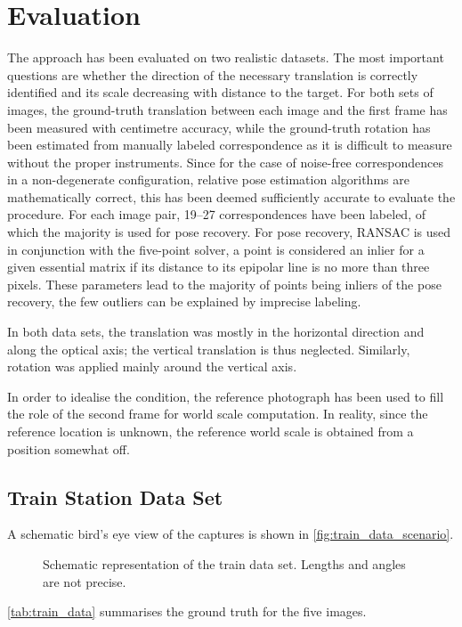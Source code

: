 \chapter{Evaluation}

The approach has been evaluated on two realistic datasets. The most important
questions are whether the direction of the necessary translation is correctly
identified and its scale decreasing with distance to the target.
For both sets of images, the ground-truth translation between each image and the
first frame has been measured with centimetre accuracy, while the ground-truth
rotation has been estimated from manually labeled correspondence as it is
difficult to measure without the proper instruments. Since for the case of
noise-free correspondences in a non-degenerate configuration, relative pose
estimation algorithms are mathematically correct, this has been deemed
sufficiently accurate to evaluate the procedure. For each image pair, 19--27
correspondences have been labeled, of which the majority is used for pose
recovery. For pose recovery, RANSAC is used in conjunction with the five-point
solver, a point is considered an inlier for a given essential matrix if its
distance to its epipolar line is no more than three pixels. These parameters
lead to the majority of points being inliers of the pose recovery, the few
outliers can be explained by imprecise labeling.

In both data sets, the translation was mostly in the horizontal direction and
along the optical axis; the vertical translation is thus neglected. Similarly,
rotation was applied mainly around the vertical axis.

In order to idealise the condition, the reference photograph has been used to
fill the role of the second frame for world scale computation. In reality, since
the reference location is unknown, the reference world scale is obtained from a
position somewhat off.

\section{Train Station Data Set}

A schematic bird's eye view of the captures is shown in \autoref{fig:train_data_scenario}.

\begin{figure}
   {\centering      
      
   \caption{Schematic representation of the train data set. Lengths and angles are not
   precise.}
   \label{fig:train_data_scenario}}
\end{figure}
\autoref{tab:train_data} summarises the ground truth for the five images.

